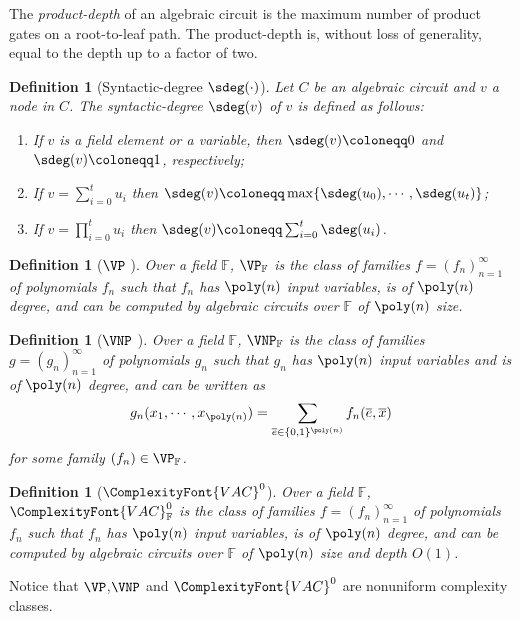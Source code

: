 \documentclass[11pt,letter]{article}
\newtheorem{definition}[theorem]{Definition}
\theoremstyle{remark} %
\newcommand{\F}{\mathbb{F}}
\newcommand{\VAC}{
    {
        \ComplexityFont{VAC}
    }
}
\begin{document}
{    The \emph{product-depth} of an algebraic circuit is the maximum number of product gates on a root-to-leaf path. The product-depth is, without loss of generality, equal to the depth up to a factor of two.
    \begin{definition}[Syntactic-degree $\sdeg(\cdot)$]
        Let $C$ be an algebraic circuit and $v$ a node in $C$. The \emph{syntactic-degree} $\sdeg(v)$ of $v$ is defined as follows:
        \begin{enumerate}
            \item If $v$ is a field element or a variable, then $\sdeg(v) \coloneqq 0$ and $\sdeg(v) \coloneqq 1$, respectively;
            \item If $v=\sum_{i=0}^t u_i$ then $\sdeg(v) \coloneqq \max\{\sdeg(u_0),\cdots, \sdeg(u_t)\}$;
            \item If $v=\prod_{i=0}^t u_i$ then $\sdeg(v) \coloneqq \sum_{i=0}^t \sdeg(u_i)$.
        \end{enumerate}
    \end{definition}
    
    \begin{definition}[$\VP$ 
    \cite{Val79:ComplClass}]
         Over a field $\mathbb{F}$, $\VP_\mathbb{F}$ is the class of families $f=(f_n)_{n=1}^{\infty}$ of polynomials $f_n$ such that $f_n$ has $\poly(n)$ input variables, is of $\poly(n)$ degree, and can be computed by algebraic circuits over $\mathbb{F}$ of $\poly(n)$ size.
    \end{definition}


    \begin{definition}[$\VNP$ \cite{Val79:ComplClass}]
         Over a field $\mathbb{F}$, $\VNP_\mathbb{F}$ is the class of families $g=(g_n)_{n=1}^{\infty}$ of polynomials $g_n$ such that $g_n$ has $\poly(n)$ input variables and is of $\poly(n)$ degree, and can be written as
        \[
            g_n(x_1, \cdots , x_{\poly(n)})=\sum_{\overline{e} \in \{0,1\}^{\poly(n)}} f_n(\overline{e},\overline{x})
        \]
        for some family $(f_n) \in \VP_\mathbb{F}$.
    \end{definition}

    \begin{definition}[$\VAC^0$]
        \label{def: VAC0}
        Over a field $\F$, $\VAC^0_\F$ is the class of families $f=(f_n)_{n=1}^{\infty}$ of polynomials $f_n$ such that $f_n$ has $\poly(n)$ input variables, is of $\poly(n)$ degree, and can be computed by algebraic circuits over $\mathbb{F}$ of $\poly(n)$ size and depth $O(1)$.
    \end{definition}
    Notice that $\VP$,$\VNP$ and $\VAC^0$ are nonuniform complexity classes.

}
\end{document}
